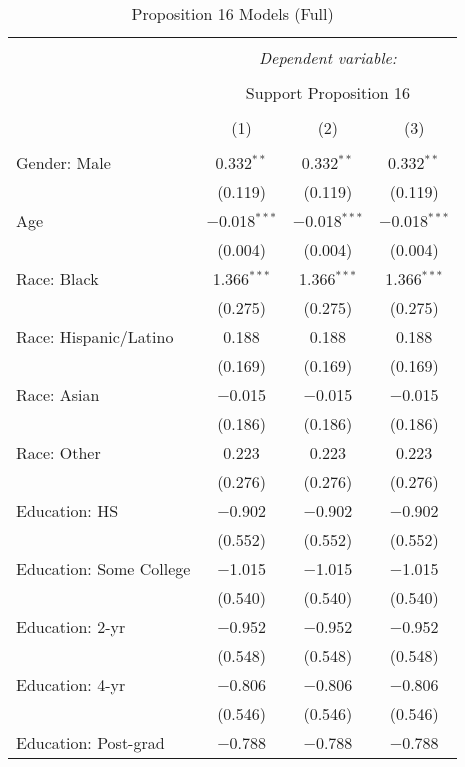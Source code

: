 
\begin{table}[!htbp] \centering 
  \caption{Proposition 16 Models (Full)} 
  \label{tab:reg_prop16_long} 
\footnotesize 
\begin{tabular}{@{\extracolsep{5pt}}lccc} 
\\[-1.8ex]\hline 
\hline \\[-1.8ex] 
 & \multicolumn{3}{c}{\textit{Dependent variable:}} \\ 
\cline{2-4} 
\\[-1.8ex] & \multicolumn{3}{c}{Support Proposition 16} \\ 
\\[-1.8ex] & (1) & (2) & (3)\\ 
\hline \\[-1.8ex] 
 Gender: Male & 0.332$^{**}$ & 0.332$^{**}$ & 0.332$^{**}$ \\ 
  & (0.119) & (0.119) & (0.119) \\ 
  Age & $-$0.018$^{***}$ & $-$0.018$^{***}$ & $-$0.018$^{***}$ \\ 
  & (0.004) & (0.004) & (0.004) \\ 
  Race: Black & 1.366$^{***}$ & 1.366$^{***}$ & 1.366$^{***}$ \\ 
  & (0.275) & (0.275) & (0.275) \\ 
  Race: Hispanic/Latino & 0.188 & 0.188 & 0.188 \\ 
  & (0.169) & (0.169) & (0.169) \\ 
  Race: Asian & $-$0.015 & $-$0.015 & $-$0.015 \\ 
  & (0.186) & (0.186) & (0.186) \\ 
  Race: Other & 0.223 & 0.223 & 0.223 \\ 
  & (0.276) & (0.276) & (0.276) \\ 
  Education: HS & $-$0.902 & $-$0.902 & $-$0.902 \\ 
  & (0.552) & (0.552) & (0.552) \\ 
  Education: Some College & $-$1.015 & $-$1.015 & $-$1.015 \\ 
  & (0.540) & (0.540) & (0.540) \\ 
  Education: 2-yr & $-$0.952 & $-$0.952 & $-$0.952 \\ 
  & (0.548) & (0.548) & (0.548) \\ 
  Education: 4-yr & $-$0.806 & $-$0.806 & $-$0.806 \\ 
  & (0.546) & (0.546) & (0.546) \\ 
  Education: Post-grad & $-$0.788 & $-$0.788 & $-$0.788 \\ 

\end{tabular}
\end{table}

